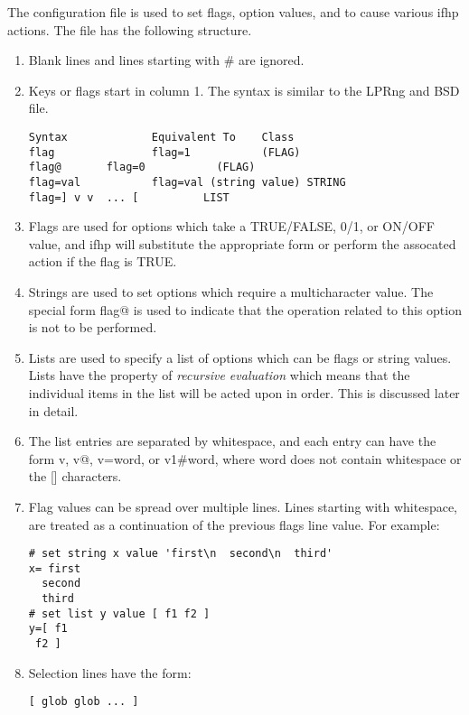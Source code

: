 \documentclass[a4paper]{article}
\begin{document}
The configuration file is used to set flags, option values, and to cause
various
{\ttfamily ifhp}
actions.
The file has the following structure.
\begin{enumerate}
\item   Blank lines and lines starting with \# are ignored.
\item   Keys or flags start in column 1.
The syntax is similar to the LPRng and BSD
file.
\begin{tscreen}
\begin{verbatim}
Syntax             Equivalent To    Class
flag               flag=1           (FLAG)
flag@       flag=0           (FLAG)
flag=val           flag=val (string value) STRING
flag=] v v  ... [          LIST
\end{verbatim}
\end{tscreen}
\item Flags are used for options which take a TRUE/FALSE, 0/1, or ON/OFF
value, and
{\ttfamily ifhp}
will substitute the appropriate form or perform the
assocated action if the flag is TRUE.
\item Strings are used to set options which require a multicharacter value.
The special form
{\ttfamily flag@}
is used to indicate that the operation
related to this option is not to be performed.
\item Lists are used to specify a list of options which can be flags or string
values.
Lists have the property of
{\itshape recursive evaluation\/}
which means that the individual items in the list will be acted upon in order.
This is discussed later in detail.
\item The list entries are separated by whitespace,
and each entry can have the form v, v@,
v=word, or v1\#word, where word does not contain whitespace or
the {[}{]} characters.
\item Flag values can be spread over multiple lines.  Lines starting with
whitespace, are treated as a continuation of the previous
flags line value.  For example:
\begin{tscreen}
\begin{verbatim}
# set string x value 'first\n  second\n  third'
x= first
  second
  third
# set list y value [ f1 f2 ]
y=[ f1
 f2 ]
\end{verbatim}
\end{tscreen}
\item Selection lines have the form:
\begin{tscreen}
\begin{verbatim}
[ glob glob ... ]
\end{verbatim}
\end{tscreen}


\end{enumerate}
\end{document}
